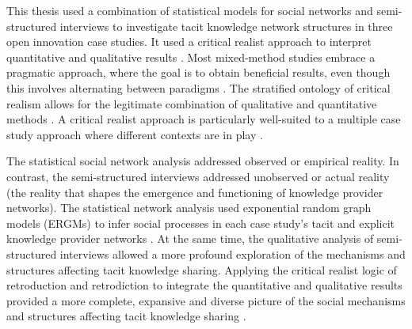 This thesis used a combination of statistical models for social networks and semi-structured interviews to investigate tacit knowledge network structures in three open innovation case studies. It used a critical realist approach to interpret quantitative and qualitative results \citep{bhaskar2013realist}. Most mixed-method studies embrace a pragmatic approach, where the goal is to obtain beneficial results, even though this involves alternating between paradigms \citep{creswell2011designing}. The stratified ontology of critical realism allows for the legitimate combination of qualitative and quantitative methods \citep{giddings2006mixed,mcevoy2006critical,mcavoy2018critical}. A critical realist approach is particularly well-suited to a multiple case study approach where different contexts are in play \citep{welch2011theorising}. \medskip

The statistical social network analysis addressed observed or empirical reality. In contrast, the semi-structured interviews addressed unobserved or actual reality (the reality that shapes the emergence and functioning of knowledge provider networks). The statistical network analysis used exponential random graph models (ERGMs) to infer social processes in each case study's tacit and explicit knowledge provider networks \citep{robins2007introduction,lusher2013exponential}. At the same time, the qualitative analysis of semi-structured interviews allowed a more profound exploration of the mechanisms and structures affecting tacit knowledge sharing. Applying the critical realist logic of retroduction and retrodiction to integrate the quantitative and qualitative results provided a more complete, expansive and diverse picture of the social mechanisms and structures affecting tacit knowledge sharing \citep{zachariadis2013methodological,mcavoy2018critical}. \medskip

